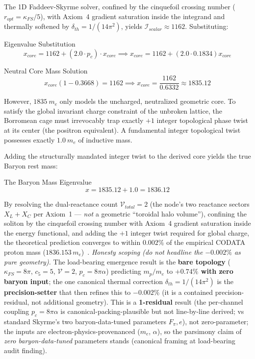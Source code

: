 The 1D Faddeev-Skyrme solver, confined by the cinquefoil crossing number ($r_{opt} = \kappa_{FS}/5$), with Axiom~4 gradient saturation inside the integrand and thermally softened by $\delta_{th} = 1/(14\pi^2)$, yields $\mathcal{I}_{scalar} \approx 1162$. Substituting:
\begin{resultbox}{Eigenvalue Substitution}
\begin{equation}
x_{core} = 1162 + (2.0 \cdot p_c) \cdot x_{core} \implies x_{core} = 1162 + (2.0 \cdot 0.1834) x_{core}
\end{equation}
\end{resultbox}
\begin{resultbox}{Neutral Core Mass Solution}
\begin{equation}
x_{core}(1 - 0.3668) = 1162 \implies x_{core} = \frac{1162}{0.6332} \approx \mathbf{1835.12}
\end{equation}
\end{resultbox}

However, $1835\ m_e$ only models the uncharged, neutralized geometric core. To satisfy the global invariant charge constraint of the unbroken lattice, the Borromean cage must irrevocably trap exactly $+1$ integer topological phase twist at its center (the positron equivalent). A fundamental integer topological twist possesses exactly $1.0\ m_e$ of inductive mass. 

Adding the structurally mandated integer twist to the derived core yields the true Baryon rest mass:
\begin{resultbox}{The Baryon Mass Eigenvalue}
\begin{equation}
x = 1835.12 + 1.0 = \mathbf{1836.12}
\end{equation}
\end{resultbox}

By resolving the dual-reactance count $\mathcal{V}_{total}=2$ (the node's two reactance sectors $X_L + X_C$ per Axiom~1 --- \emph{not} a geometric ``toroidal halo volume''), confining the soliton by the cinquefoil crossing number with Axiom~4 gradient saturation inside the energy functional, and adding the $+1$ integer twist required for global charge, the theoretical prediction converges to within $\mathbf{0.002\%}$ of the empirical CODATA proton mass ($1836.153\,m_e$)~\cite{codata2018}. \emph{Honesty scoping (do not headline the $-0.002\%$ as pure geometry).} The load-bearing emergence result is the \textbf{bare topology} ($\kappa_{FS}=8\pi$, $c_5=5$, $\mathcal{V}=2$, $p_c=8\pi\alpha$) predicting $m_p/m_e$ to \textbf{$+0.74\%$ with zero baryon input}; the one canonical thermal correction $\delta_{th}=1/(14\pi^2)$ is the \textbf{precision-setter} that then refines this to $-0.002\%$ (it is a contained precision-residual, not additional geometry). This is a \textbf{1-residual} result (the per-channel coupling $p_c = 8\pi\alpha$ is canonical-packing-plausible but not line-by-line derived; vs standard Skyrme's two baryon-data-tuned parameters $F_\pi, e$), not zero-parameter; the inputs are electron-physics-provenanced ($m_e$, $\alpha$), so the parsimony claim of \emph{zero baryon-data-tuned} parameters stands (canonical framing at  load-bearing audit finding).

